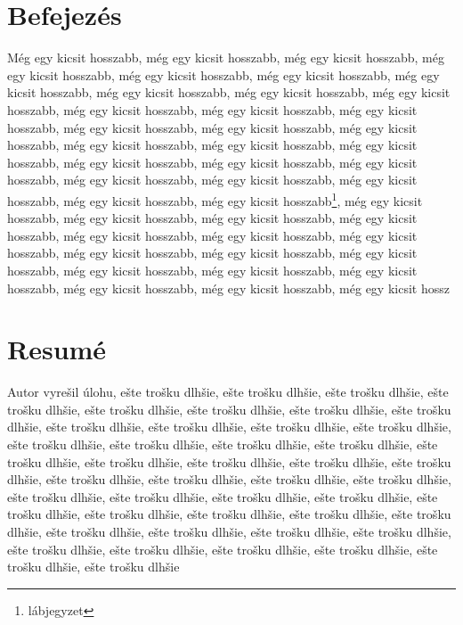 \documentclass[a4paper,oneside,onecolumn,12pt]{LegrandOrangeBook}
\begin{document}
\chapter*{Befejezés}

Még egy kicsit hosszabb, még egy kicsit hosszabb, még egy kicsit hosszabb, még egy kicsit hosszabb, még egy kicsit hosszabb, még egy kicsit hosszabb, még egy kicsit hosszabb, még egy kicsit hosszabb, még egy kicsit hosszabb, még egy kicsit hosszabb, még egy kicsit hosszabb, még egy kicsit hosszabb, még egy kicsit hosszabb, még egy kicsit hosszabb, még egy kicsit hosszabb, még egy kicsit hosszabb, még egy kicsit hosszabb, még egy kicsit hosszabb, még egy kicsit hosszabb, még egy kicsit hosszabb, még egy kicsit hosszabb, még egy kicsit hosszabb, még egy kicsit hosszabb, még egy kicsit hosszabb, még egy kicsit hosszabb, még egy kicsit hosszabb, még egy kicsit hosszabb\footnote{lábjegyzet}, még egy kicsit hosszabb, még egy kicsit hosszabb, még egy kicsit hosszabb, még egy kicsit hosszabb, még egy kicsit hosszabb, még egy kicsit hosszabb, még egy kicsit hosszabb, még egy kicsit hosszabb, még egy kicsit hosszabb, még egy kicsit hosszabb, még egy kicsit hosszabb, még egy kicsit hosszabb, még egy kicsit hosszabb, még egy kicsit hosszabb, még egy kicsit hosszabb, még egy kicsit hossz


\pagebreak
\chapter*{Resumé}

Autor vyrešil úlohu, ešte trošku dlhšie, ešte trošku dlhšie, ešte trošku dlhšie, ešte trošku dlhšie, ešte trošku dlhšie, ešte trošku dlhšie, ešte trošku dlhšie, ešte trošku dlhšie, ešte trošku dlhšie, ešte trošku dlhšie, ešte trošku dlhšie, ešte trošku dlhšie, ešte trošku dlhšie, ešte trošku dlhšie, ešte trošku dlhšie, ešte trošku dlhšie, ešte trošku dlhšie, ešte trošku dlhšie, ešte trošku dlhšie, ešte trošku dlhšie, ešte trošku dlhšie, ešte trošku dlhšie, ešte trošku dlhšie, ešte trošku dlhšie, ešte trošku dlhšie, ešte trošku dlhšie, ešte trošku dlhšie, ešte trošku dlhšie, ešte trošku dlhšie, ešte trošku dlhšie, ešte trošku dlhšie, ešte trošku dlhšie, ešte trošku dlhšie, ešte trošku dlhšie, ešte trošku dlhšie, ešte trošku dlhšie, ešte trošku dlhšie, ešte trošku dlhšie, ešte trošku dlhšie, ešte trošku dlhšie, ešte trošku dlhšie, ešte trošku dlhšie, ešte trošku dlhšie, ešte trošku dlhšie

% 

\printbibliography[title=References] %
\pagebreak
\thispagestyle{empty}
\mbox{}
\vfill
\begin{Center}
\mbox{\vskip1cm}\EANisbn
\end{Center}
\end{document}
